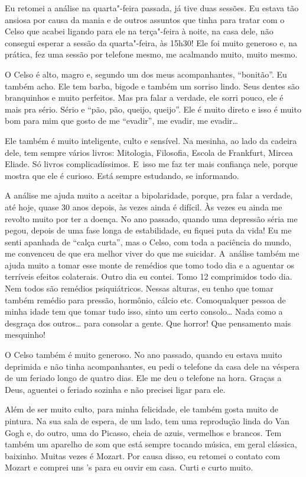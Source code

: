 Eu retomei a análise na quarta"-feira passada, já tive duas sessões. Eu
estava tão ansiosa por causa da mania e de outros assuntos que tinha
para tratar com o Celso que acabei ligando para ele na terça"-feira à
noite, na casa dele, não consegui esperar a sessão da quarta"-feira, às
15h30! Ele foi muito generoso e, na prática, fez uma sessão por telefone
mesmo, me acalmando muito, muito mesmo.

O Celso é alto, magro e, segundo um dos meus acompanhantes, ``bonitão''.
Eu também acho. Ele tem barba, bigode e também um sorriso lindo. Seus
dentes são branquinhos e muito perfeitos. Mas pra falar a verdade, ele
sorri pouco, ele é mais pra sério. Sério e ``pão, pão, queijo, queijo''.
Ele é muito direto e isso é muito bom para mim que gosto de me
``evadir'', me evadir, me evadir…

Ele também é muito inteligente, culto e sensível. Na mesinha, ao lado da
cadeira dele, tem sempre vários livros: Mitologia, Filosofia, Escola de
Frankfurt, Mircea Eliade. Só livros complicadíssimos. E~isso me faz ter
mais confiança nele, porque mostra que ele é curioso. Está sempre
estudando, se informando.

A análise me ajuda muito a aceitar a bipolaridade, porque, pra falar a
verdade, até hoje, quase 30 anos depois, às vezes ainda é difícil. Às
vezes eu ainda me revolto muito por ter a doença. No ano passado, quando
uma depressão séria me pegou, depois de uma fase longa de estabilidade,
eu fiquei puta da vida! Eu me senti apanhada de ``calça curta'', mas o
Celso, com toda a paciência do mundo, me convenceu de que era melhor
viver do que me suicidar. A~análise também me ajuda muito a tomar esse
monte de remédios que tomo todo dia e a aguentar os terríveis efeitos
colaterais. Outro dia eu contei. Tomo 12 comprimidos todo dia. Nem todos
são remédios psiquiátricos. Nessas alturas, eu tenho que tomar também
remédio para pressão, hormônio, cálcio etc. Comoqualquer pessoa de minha
idade tem que tomar tudo isso, sinto um certo consolo… Nada como
a desgraça dos outros… para consolar a gente. Que horror! Que
pensamento mais mesquinho!

O Celso também é muito generoso. No ano passado, quando eu estava muito
deprimida e não tinha acompanhantes, eu pedi o telefone da casa dele na
véspera de um feriado longo de quatro dias. Ele me deu o telefone na
hora. Graças a Deus, aguentei o feriado sozinha e não precisei ligar
para ele.

Além de ser muito culto, para minha felicidade, ele também gosta muito
de pintura. Na sua sala de espera, de um lado, tem uma reprodução linda
do Van Gogh e, do outro, uma do Picasso, cheia de azuis, vermelhos e
brancos. Tem também um aparelho de som que está sempre tocando música,
em geral clássica, baixinho. Muitas vezes é Mozart. Por causa disso, eu
retomei o contato com Mozart e comprei uns 's para eu ouvir em casa.
Curti e curto muito.

